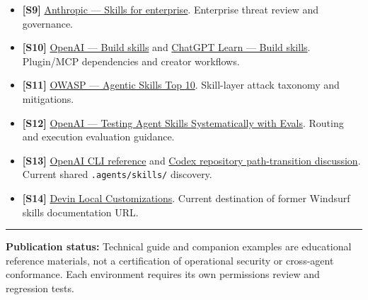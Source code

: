 \documentclass[
  10pt,
  letterpaper,
]{article}
\newcommand{\passthrough}[1]{#1}
\begin{document}
\begin{itemize}
{  commands} and
  \href{https://github.com/vercel-labs/skills/blob/main/docs/agents.md}{supported
  agents}. Installation behavior and supported targets.
\item
  \textbf{{[}S9{]}}
  \href{https://platform.claude.com/docs/en/agents-and-tools/agent-skills/enterprise}{Anthropic
  --- Skills for enterprise}. Enterprise threat review and governance.
\item
  \textbf{{[}S10{]}}
  \href{https://developers.openai.com/plugins/build/skills}{OpenAI ---
  Build skills} and
  \href{https://learn.chatgpt.com/docs/build-skills}{ChatGPT Learn ---
  Build skills}. Plugin/MCP dependencies and creator workflows.
\item
  \textbf{{[}S11{]}}
  \href{https://owasp.github.io/www-project-agentic-skills-top-10/}{OWASP
  --- Agentic Skills Top 10}. Skill-layer attack taxonomy and
  mitigations.
\item
  \textbf{{[}S12{]}}
  \href{https://developers.openai.com/blog/eval-skills}{OpenAI ---
  Testing Agent Skills Systematically with Evals}. Routing and execution
  evaluation guidance.
\item
  \textbf{{[}S13{]}}
  \href{https://developers.openai.com/api/reference/cli}{OpenAI CLI
  reference} and
  \href{https://github.com/openai/codex/issues/22590}{Codex repository
  path-transition discussion}. Current shared
  \passthrough{\lstinline!.agents/skills/!} discovery.
\item
  \textbf{{[}S14{]}}
  \href{https://docs.devin.ai/desktop/devin-local/customizations}{Devin
  Local Customizations}. Current destination of former Windsurf skills
  documentation URL.
\end{itemize}

\begin{center}\rule{0.5\linewidth}{0.5pt}\end{center}

\textbf{Publication status:} Technical guide and companion examples are
educational reference materials, not a certification of operational
security or cross-agent conformance. Each environment requires its own
permissions review and regression tests.
\end{document}

